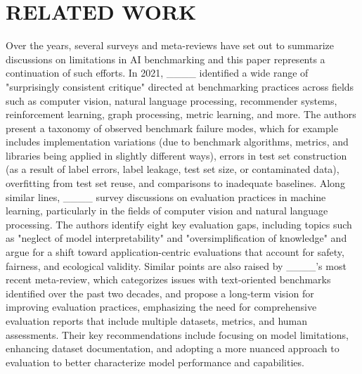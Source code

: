 \section{RELATED WORK}
Over the years, several surveys and meta-reviews have set out to summarize discussions on limitations in AI benchmarking and this paper represents a continuation of such efforts. %
In 2021, ____ identified a wide range of "surprisingly consistent critique" directed at benchmarking practices across fields such as computer vision, natural language processing, recommender systems, reinforcement learning, graph processing, metric learning, and more. The authors present a taxonomy of observed benchmark failure modes, which for example includes implementation variations (due to benchmark algorithms, metrics, and libraries being applied in slightly different ways), errors in test set construction (as a result of label errors, label leakage, test set size, or contaminated data), overfitting from test set reuse, and comparisons to inadequate baselines. Along similar lines, ____ survey discussions on evaluation practices in machine learning, particularly in the fields of computer vision and natural language processing. The authors identify eight key evaluation gaps, including topics such as "neglect of model interpretability" and "oversimplification of knowledge" and argue for a shift toward application-centric evaluations that account for safety, fairness, and ecological validity. Similar points are also raised by ____'s most recent meta-review, which categorizes issues with text-oriented benchmarks identified over the past two decades, and propose a long-term vision for improving evaluation practices, emphasizing the need for comprehensive evaluation reports that include multiple datasets, metrics, and human assessments. Their key recommendations include focusing on model limitations, enhancing dataset documentation, and adopting a more nuanced approach to evaluation to better characterize model performance and capabilities.

